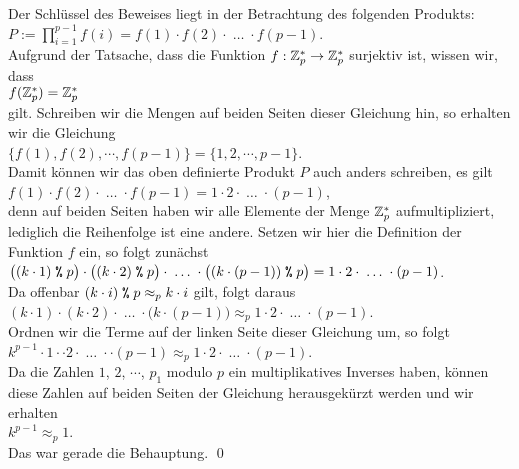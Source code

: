 Der Schlüssel des Beweises liegt in der Betrachtung des folgenden Produkts:
\\[0.2cm]
\hspace*{1.3cm}
$P := \prod\limits_{i=1}^{p-1} f(i) = f(1) \cdot f(2) \cdot \;\dots\; \cdot f(p-1)$.
\\[0.2cm]
Aufgrund der Tatsache, dass die Funktion $f:\mathbb{Z}_{p}^* \rightarrow \mathbb{Z}_{p}^*$ surjektiv ist, wissen  wir, dass
\\[0.2cm]
\hspace*{1.3cm}
$f(\mathbb{Z}_{p}^*) = \mathbb{Z}_{p}^*$
\\[0.2cm]
gilt. Schreiben  wir die Mengen auf beiden Seiten dieser Gleichung hin, so erhalten wir die Gleichung
\\[0.2cm]
\hspace*{1.3cm}
$\bigl\{ f(1), f(2), \cdots, f(p-1) \bigr\} = \bigl\{ 1, 2, \cdots, p-1 \bigr\}$.
\\[0.2cm]
Damit können wir das oben definierte Produkt $P$ auch anders schreiben, es gilt
\\[0.2cm]
\hspace*{1.3cm}
$f(1) \cdot f(2) \cdot \;\dots\; \cdot f(p-1) = 1 \cdot 2 \cdot \;\dots\; \cdot (p-1)$,
\\[0.2cm]
denn auf beiden Seiten haben wir alle Elemente der Menge $\mathbb{Z}_{p}^*$ aufmultipliziert, lediglich die
Reihenfolge ist eine andere.  Setzen wir hier die Definition der Funktion $f$ ein, so
folgt zunächst
\\[0.2cm]
\hspace*{1.3cm}
$\bigl((k \cdot 1) \;\texttt{\%}\; p\bigr) \cdot \bigl((k \cdot 2) \;\texttt{\%}\; p\bigr) \cdot \;\dots\; \cdot 
 \bigl((k \cdot (p-1)) \;\texttt{\%}\; p\bigr) =
  1 \cdot 2 \cdot \;\dots\; \cdot (p-1)$.
\\[0.2cm]
Da offenbar $(k \cdot i) \;\texttt{\%}\; p \approx_p k \cdot i$ gilt, folgt daraus
\\[0.2cm]
\hspace*{1.3cm}
$(k \cdot 1) \cdot (k \cdot 2) \cdot \;\dots\; \cdot \bigl(k\cdot(p-1)) \approx_p 
  1 \cdot 2 \cdot \;\dots\; \cdot (p-1)$.
\\[0.2cm]
Ordnen wir die Terme auf der linken Seite dieser Gleichung um, so folgt
\\[0.2cm]
\hspace*{1.3cm}
$k^{p-1} \cdot 1 \cdot \cdot 2 \cdot \;\dots\; \cdot \cdot(p-1) \approx_p 
  1 \cdot 2 \cdot \;\dots\; \cdot (p-1)
$.
\\[0.2cm]
Da die Zahlen $1$, $2$, $\cdots$, $p_1$ modulo $p$ ein multiplikatives Inverses haben, können diese Zahlen
auf beiden Seiten der Gleichung herausgekürzt werden und wir erhalten
\\[0.2cm]
\hspace*{1.3cm}
$k^{p-1} \approx_p 1$.
\\[0.2cm]
Das war gerade die Behauptung. \qed


